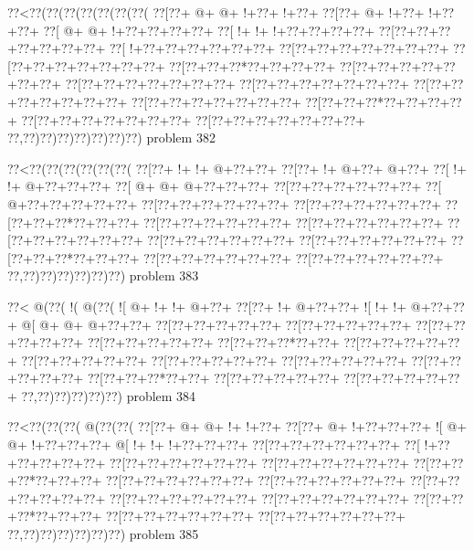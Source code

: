 \vbox{\vbox{\goo
\0??<\0??(\0??(\0??(\0??(\0??(\0??(\0??(
\0??[\0??+\- @+\- @+\- !+\0??+\- !+\0??+
\0??[\0??+\- @+\- !+\0??+\- !+\0??+\0??+
\0??[\- @+\- @+\- !+\0??+\0??+\0??+\0??+
\0??[\- !+\- !+\- !+\0??+\0??+\0??+\0??+
\0??[\0??+\0??+\0??+\0??+\0??+\0??+\0??+
\0??[\- !+\0??+\0??+\0??+\0??+\0??+\0??+
\0??[\0??+\0??+\0??+\0??+\0??+\0??+\0??+
\0??[\0??+\0??+\0??+\0??+\0??+\0??+\0??+
\0??[\0??+\0??+\0??*\0??+\0??+\0??+\0??+
\0??[\0??+\0??+\0??+\0??+\0??+\0??+\0??+
\0??[\0??+\0??+\0??+\0??+\0??+\0??+\0??+
\0??[\0??+\0??+\0??+\0??+\0??+\0??+\0??+
\0??[\0??+\0??+\0??+\0??+\0??+\0??+\0??+
\0??[\0??+\0??+\0??+\0??+\0??+\0??+\0??+
\0??[\0??+\0??+\0??*\0??+\0??+\0??+\0??+
\0??[\0??+\0??+\0??+\0??+\0??+\0??+\0??+
\0??[\0??+\0??+\0??+\0??+\0??+\0??+\0??+
\0??,\0??)\0??)\0??)\0??)\0??)\0??)\0??)
}
\hfil problem 382\hfil\break
}

\vbox{\vbox{\goo
\0??<\0??(\0??(\0??(\0??(\0??(\0??(
\0??[\0??+\- !+\- !+\- @+\0??+\0??+
\0??[\0??+\- !+\- @+\0??+\- @+\0??+
\0??[\- !+\- !+\- @+\0??+\0??+\0??+
\0??[\- @+\- @+\- @+\0??+\0??+\0??+
\0??[\0??+\0??+\0??+\0??+\0??+\0??+
\0??[\- @+\0??+\0??+\0??+\0??+\0??+
\0??[\0??+\0??+\0??+\0??+\0??+\0??+
\0??[\0??+\0??+\0??+\0??+\0??+\0??+
\0??[\0??+\0??+\0??*\0??+\0??+\0??+
\0??[\0??+\0??+\0??+\0??+\0??+\0??+
\0??[\0??+\0??+\0??+\0??+\0??+\0??+
\0??[\0??+\0??+\0??+\0??+\0??+\0??+
\0??[\0??+\0??+\0??+\0??+\0??+\0??+
\0??[\0??+\0??+\0??+\0??+\0??+\0??+
\0??[\0??+\0??+\0??*\0??+\0??+\0??+
\0??[\0??+\0??+\0??+\0??+\0??+\0??+
\0??[\0??+\0??+\0??+\0??+\0??+\0??+
\0??,\0??)\0??)\0??)\0??)\0??)\0??)
}
\hfil problem 383\hfil\break
}

\vbox{\vbox{\goo
\0??<\- @(\0??(\- !(\- @(\0??(
\- ![\- @+\- !+\- !+\- @+\0??+
\0??[\0??+\- !+\- @+\0??+\0??+
\- ![\- !+\- !+\- @+\0??+\0??+
\- @[\- @+\- @+\- @+\0??+\0??+
\0??[\0??+\0??+\0??+\0??+\0??+
\0??[\0??+\0??+\0??+\0??+\0??+
\0??[\0??+\0??+\0??+\0??+\0??+
\0??[\0??+\0??+\0??+\0??+\0??+
\0??[\0??+\0??+\0??*\0??+\0??+
\0??[\0??+\0??+\0??+\0??+\0??+
\0??[\0??+\0??+\0??+\0??+\0??+
\0??[\0??+\0??+\0??+\0??+\0??+
\0??[\0??+\0??+\0??+\0??+\0??+
\0??[\0??+\0??+\0??+\0??+\0??+
\0??[\0??+\0??+\0??*\0??+\0??+
\0??[\0??+\0??+\0??+\0??+\0??+
\0??[\0??+\0??+\0??+\0??+\0??+
\0??,\0??)\0??)\0??)\0??)\0??)
}
\hfil problem 384\hfil\break
}

\vbox{\vbox{\goo
\0??<\0??(\0??(\0??(\- @(\0??(\0??(
\0??[\0??+\- @+\- @+\- !+\- !+\0??+
\0??[\0??+\- @+\- !+\0??+\0??+\0??+
\- ![\- @+\- @+\- !+\0??+\0??+\0??+
\- @[\- !+\- !+\- !+\0??+\0??+\0??+
\0??[\0??+\0??+\0??+\0??+\0??+\0??+
\0??[\- !+\0??+\0??+\0??+\0??+\0??+
\0??[\0??+\0??+\0??+\0??+\0??+\0??+
\0??[\0??+\0??+\0??+\0??+\0??+\0??+
\0??[\0??+\0??+\0??*\0??+\0??+\0??+
\0??[\0??+\0??+\0??+\0??+\0??+\0??+
\0??[\0??+\0??+\0??+\0??+\0??+\0??+
\0??[\0??+\0??+\0??+\0??+\0??+\0??+
\0??[\0??+\0??+\0??+\0??+\0??+\0??+
\0??[\0??+\0??+\0??+\0??+\0??+\0??+
\0??[\0??+\0??+\0??*\0??+\0??+\0??+
\0??[\0??+\0??+\0??+\0??+\0??+\0??+
\0??[\0??+\0??+\0??+\0??+\0??+\0??+
\0??,\0??)\0??)\0??)\0??)\0??)\0??)
}
\hfil problem 385\hfil\break
}

